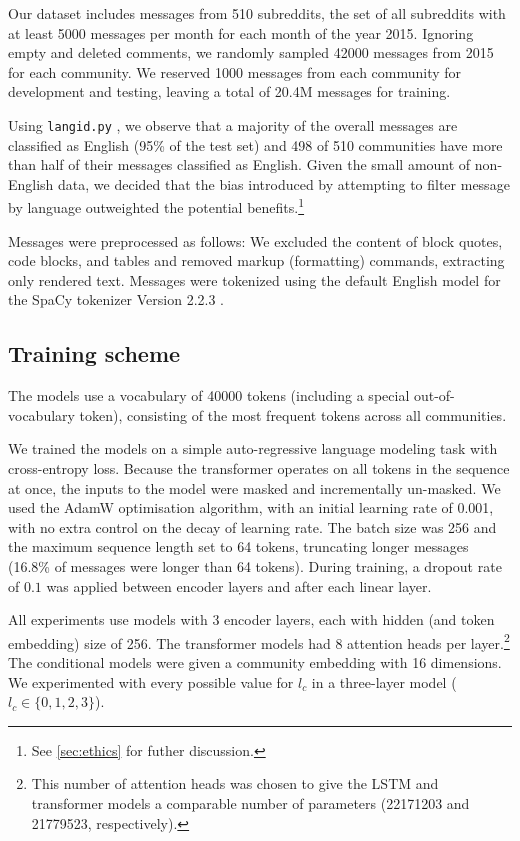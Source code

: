 \documentclass[11pt]{article}
\begin{document}
Our dataset includes messages from \num{510} subreddits, 
the set of all subreddits 
with at least \num{5000} messages per month for each month
of the year 2015.
Ignoring empty and deleted comments, we randomly sampled
\num{42000} messages from 2015 for each community.
We reserved \num{1000} messages from each community for development and testing,
leaving a total of \num{20.4}M messages for training.

Using \texttt{langid.py} \citep{Lui2012}, we observe that a majority of the overall
messages are classified as English (95\% of the test set) and 498 of \num{510} communities %
have more than half of their messages classified as English.
Given the small amount of non-English data, 
we decided that the bias introduced by attempting to filter message
by language outweighted the potential benefits.\footnote{
  See \cref{sec:ethics} for futher discussion.}

Messages were preprocessed as follows:
We excluded the content of block quotes, code blocks, and tables and
removed markup (formatting) commands, 
extracting only rendered text.
Messages were tokenized using the default English model for the SpaCy tokenizer 
Version 2.2.3 \citep{Honnibal2017}.


\subsection{Training scheme}

The models use a vocabulary of \num{40000} tokens (including a special
out-of-vocabulary token), consisting of the most frequent tokens
across all communities.

We trained the models on a simple 
auto-regressive language modeling task with cross-entropy loss.  Because
the transformer operates on all tokens in the sequence at once, the
inputs to the model were masked and incrementally un-masked.
We used the AdamW
\citep{Loshchilov2019} optimisation algorithm, with an initial
learning rate of \num{0.001}, with no extra control on the decay
of learning rate.
%
The batch size was \num{256} and the maximum sequence length set to
\num{64} tokens, truncating longer messages (16.8\% of messages were
longer than \num{64} tokens).  During training, a dropout rate of
$0.1$ was applied between encoder layers and after each linear layer.

All experiments use models with \num{3} encoder layers,
each with hidden (and token embedding) size of \num{256}. 
The transformer models had \num{8} attention heads per layer.\footnote{
  This number of attention heads was chosen to give the LSTM and transformer
  models a comparable number of parameters 
  (\num{22171203} and \num{21779523}, respectively).}
The conditional models were given a community embedding with \num{16} dimensions. 
We experimented with every possible value for $l_c$ in a three-layer model ($l_c\in\{0,1,2,3\}$).
\end{document}
